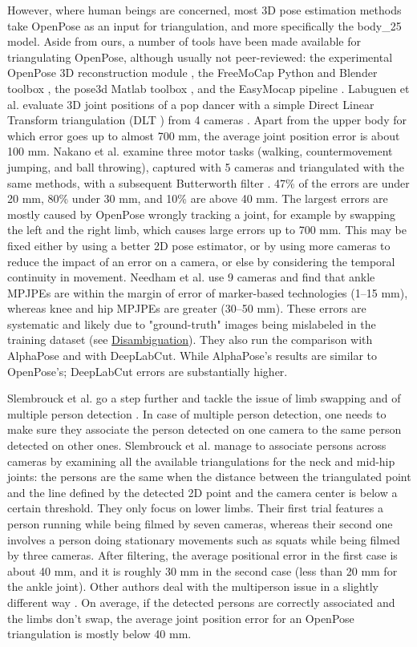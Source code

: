 However, where human beings are concerned, most 3D pose estimation methods take OpenPose as an input for triangulation, and more specifically the body\_25 model. Aside from ours, a number of tools have been made available for triangulating OpenPose, although usually not peer-reviewed: the experimental OpenPose 3D reconstruction module \cite{Hidalgo2021}, the FreeMoCap Python and Blender toolbox \cite{Matthis2022}, the pose3d Matlab toolbox \cite{Sheshadri2020}, and the EasyMocap pipeline \cite{Easymocap2021}. Labuguen et al. evaluate 3D joint positions of a pop dancer with a simple Direct Linear Transform triangulation (DLT \cite{Hartley1997,Miller1980}) from 4 cameras \cite{Labuguen2020}. Apart from the upper body for which error goes up to almost 700 mm, the average joint position error is about 100 mm. Nakano et al. examine three motor tasks (walking, countermovement jumping, and ball throwing), captured with 5 cameras and triangulated with the same methods, with a subsequent Butterworth filter \cite{Nakano2019}. 47\% of the errors are under 20 mm, 80\% under 30 mm, and 10\% are above 40 mm. The largest errors are mostly caused by OpenPose wrongly tracking a joint, for example by swapping the left and the right limb, which causes large errors up to 700 mm. This may be fixed either by using a better 2D pose estimator, or by using more cameras to reduce the impact of an error on a camera, or else by considering the temporal continuity in movement. Needham et al. use 9 cameras and find that ankle MPJPEs are within the margin of error of marker-based technologies (1–15 mm), whereas knee and hip MPJPEs are greater (30–50 mm). These errors are systematic and likely due to "ground-truth" images being mislabeled in the training dataset \cite{Needham2021b} (see \hyperlink{Ann:gloss}{Disambiguation}). They also run the comparison with AlphaPose and with DeepLabCut. While AlphaPose's results are similar to OpenPose’s; DeepLabCut errors are substantially higher.

Slembrouck et al. go a step further and tackle the issue of limb swapping and of multiple person detection \cite{Slembrouck2020}. In case of multiple person detection, one needs to make sure they associate the person detected on one camera to the same person detected on other ones. Slembrouck et al. manage to associate persons across cameras by examining all the available triangulations for the neck and mid-hip joints: the persons are the same when the distance between the triangulated point and the line defined by the detected 2D point and the camera center is below a certain threshold. They only focus on lower limbs. Their first trial features a person running while being filmed by seven cameras, whereas their second one involves a person doing stationary movements such as squats while being filmed by three cameras. After filtering, the average positional error in the first case is about 40 mm, and it is roughly 30 mm in the second case (less than 20 mm for the ankle joint). Other authors deal with the multiperson issue in a slightly different way \cite{Bridgeman2019,Chu2021,Dong2019}. On average, if the detected persons are correctly associated and the limbs don’t swap, the average joint position error for an OpenPose triangulation is mostly below 40 mm.

